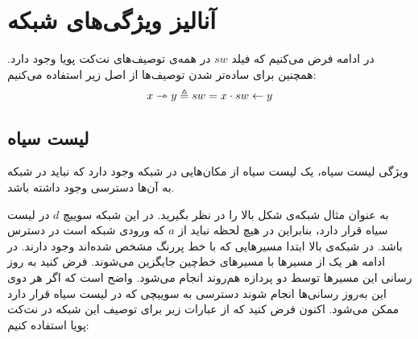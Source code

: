 \section{آنالیز ویژگی‌های شبکه}
در ادامه فرض‌ می‌کنیم که فیلد
$sw$
در همه‌ی توصیف‌های نت‌کت پویا وجود دارد.
همچنین برای ساده‌تر شدن توصیف‌ها از اصل زیر استفاده می‌کنیم:
\begin{equation*}
    x \rightarrowtriangle y \triangleq sw = x \cdot sw \leftarrow y
\end{equation*}

\subsection{لیست‌ سیاه}
ویژگی لیست‌ سیاه، یک لیست‌ سیاه از مکان‌هایی در شبکه وجود دارد که نباید در شبکه به آن‌ها دسترسی وجود داشته باشد.
\begin{figure}
    \centering
\end{figure}
به عنوان مثال شبکه‌ی شکل بالا را در نظر بگیرید.
در این شبکه سوییچ
$d$
در لیست‌ سیاه قرار دارد، بنابراین در هیچ لحظه نباید از
$a$
که ورودی شبکه است در دسترس باشد.
در شبکه‌ی بالا ابتدا مسیر‌هایی که با خط پررنگ مشخص شده‌اند وجود دارند.
در ادامه هر یک از مسیرها با مسیر‌های خط‌چین جایگزین می‌شوند.
فرض کنید به روز رسانی این مسیر‌ها توسط دو پردازه هم‌روند انجام می‌شود.
واضح است که اگر هر دوی این به‌روز رسانی‌ها انجام شوند دسترسی به سوییچی که در لیست سیاه قرار دارد ممکن می‌شود.
اکنون فرض کنید که از عبارات زیر برای توصیف این شبکه در نت‌کت پویا استفاده کنیم:

